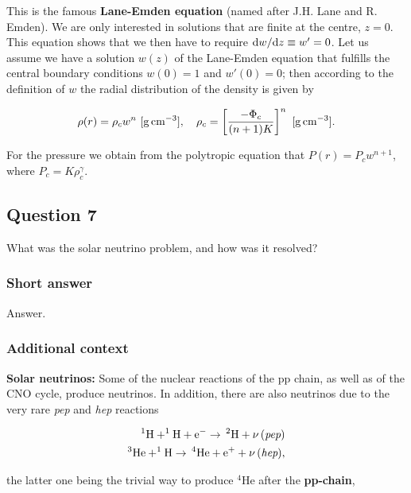\documentclass[a4paper,10pt]{article}
\begin{document}
{\noindent}This is the famous \textbf{Lane-Emden equation} (named after J.H. Lane and R. Emden). We are only interested in solutions that are finite at the centre, $z=0$. This equation shows that we then have to require ${\rm d}w/{\rm d}z\equiv w'=0$. Let us assume we have a solution $w(z)$ of the Lane-Emden equation that fulfills the central boundary conditions $w(0)=1$ and $w'(0)=0$; then according to the definition of $w$ the radial distribution of the density is given by

\begin{align*}
    \rho(r) = \rho_cw^n ~ [{\rm g\,cm^{-3}}], ~~~ \rho_c = \left[ \frac{-\Phi_c}{(n+1)K} \right]^n ~ [{\rm g\,cm^{-3}}].
\end{align*}

{\noindent}For the pressure we obtain from the polytropic equation that $P(r)=P_cw^{n+1}$, where $P_c=K\rho_c^\gamma$.


\newpage
\subsection{Question 7}

What was the solar neutrino problem, and how was it resolved?

\subsubsection{Short answer}

Answer.

\subsubsection{Additional context}

{\noindent}\textbf{Solar neutrinos:} Some of the nuclear reactions of the pp chain, as well as of the CNO cycle, produce neutrinos. In addition, there are also neutrinos due to the very rare \textit{pep} and \textit{hep} reactions

\begin{align*}
    {\rm ^1H+^1H+e^- \rightarrow\,^2H+\nu\,(\textit{pep})} \\
    {\rm ^3He+^1H \rightarrow\,^4He+e^++\nu\,(\textit{hep})},
\end{align*}

{\noindent}the latter one being the trivial way to produce $^4$He after the \textbf{pp-chain},
\end{document}
